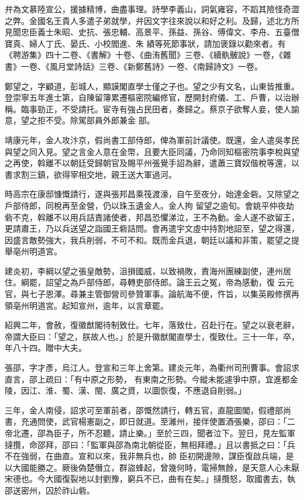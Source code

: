 \begin{pinyinscope}
 弁為文慕陸宣公，援據精博，曲盡事理。詩學李義山，詞氣雍容，不蹈其險怪奇澀之弊。金國名王貴人多遣子弟就學，弁因文字往來說以和好之利。及歸，述北方所見聞忠臣義士朱昭、史抗、張忠輔、高景平、孫益、孫谷、傅偉文、李舟、五臺僧寶真、婦人丁氏、晏氏、小校閻進、朱
 績等死節事狀，請加褒錄以勸來者。有《聘游集》四十二卷、《書解》十卷、《曲洧舊聞》三卷、《續骫骳說》一卷，《雜書》一卷、《風月堂詩話》三卷、《新鄭舊詩》一卷、《南歸詩文》一卷。



 鄭望之，字顧道，彭城人，顯謨閣直學士僅之子也。望之少有文名，山東皆推重。登崇寧五年進士第，自陳留簿累遷樞密院編修官，歷開封府儀、工、戶曹，以治辦稱。臨事勁正，不受請托。宦寺有強占民田者，奏歸之。蔡京子欲奪人妾，使人諭意，望之拒不受。除駕部員外郎兼金
 部。



 靖康元年，金人攻汴京，假尚書工部侍郎，俾為軍前計議使。既還，金人遣吳孝民與望之同入見。望之言金人意在金幣，且要大臣同議，乃命同知樞密院事李梲與望之再使，斡離不以朝廷受歸朝官及賜平州張覺手詔為辭，遣蕭三寶奴偕梲等還，以書求割三鎮，欲得宰相交地，親王送大軍過河。



 時高宗在康邸慷慨請行，遂與張邦昌乘筏渡濠，自午至夜分，始達金砦。又除望之戶部侍郎，同梲再至金營，仍以珠玉遺金人。金人拘
 留望之逾旬。會姚平仲夜劫砦不克，斡離不以用兵詰責諸使者，邦昌恐懼涕泣，王不為動。金人遂不欲留王，更請肅王，乃以兵送望之詣國王砦詰問。會再遣宇文虛中持割地詔至，望之得還，因盛言敵勢強大，我兵削弱，不可不和。既而金兵退，朝廷以議和非策，罷望之提舉亳州明道宮。



 建炎初，李綱以望之張皇敵勢，沮損國威，以致禍敗，責海州團練副使，連州居住。綱罷，詔望之為戶部侍郎，尋轉吏部侍郎。論王云之冤，帝為感動，復
 云元官，與七子恩澤。尋兼主管御營司參贊軍事。論航海不便，忤旨，以集英殿修撰再領亳州明道宮。起知宣州，逾年，以言章罷。



 紹興二年，會赦，復徽猷閣待制致仕。七年，落致仕，召赴行在。望之以衰老辭，帝謂大臣曰：「望之，朕故人也。」於是升徽猷閣直學士，復致仕。三十一年，卒，年八十四。贈中大夫。



 張邵，字才彥，烏江人。登宣和三年上舍第。建炎元年，為衢州司刑曹事。會詔求直言，邵上疏曰：「有中原之形勢，
 有東南之形勢。今縱未能遽爭中原，宜進都金陵，因江、淮、蜀、漢、閩、廣之資，以圖恢復，不應退自削弱。」



 三年，金人南侵，詔求可至軍前者，邵慨然請行，轉五官，直龍圖閣，假禮部尚書，充通問使，武官楊憲副之，即日就道。至濰州，接伴使置酒張樂，邵曰：「二帝北遷，邵為臣子，所不忍聽，請止樂。」至於三四，聞者泣下。翌日，見左監軍撻攬，命邵拜，邵曰：「監軍與邵為南北朝從臣，無相拜禮。」且以書抵之曰：「兵不在強弱，在曲直。宣和以來，我非無兵也，帥
 臣初開邊隙，謀臣復啟兵端，是以大國能勝之。厥後偽楚僭立，群盜蜂起，曾幾何時，電掃無餘，是天意人心未厭宋德也。今大國復裂地以封劉豫，窮兵不已，曲有在矣。」撻攬怒，取國書去，執邵送密州，囚於祚山砦。




\end{pinyinscope}
